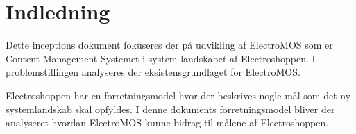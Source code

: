 \thispagestyle{fancy}

\section{Indledning}
Dette inceptions dokument fokuseres der på udvikling af ElectroMOS som er Content Management Systemet i system landskabet af Electroshoppen. I problemstillingen analyseres der eksistensgrundlaget for ElectroMOS. 

Electroshoppen har en forretningsmodel hvor der beskrives nogle mål som det ny systemlandskab skal opfyldes. I denne dokuments forretningsmodel bliver der analyseret hvordan ElectroMOS kunne bidrag til målene af Electroshoppen.